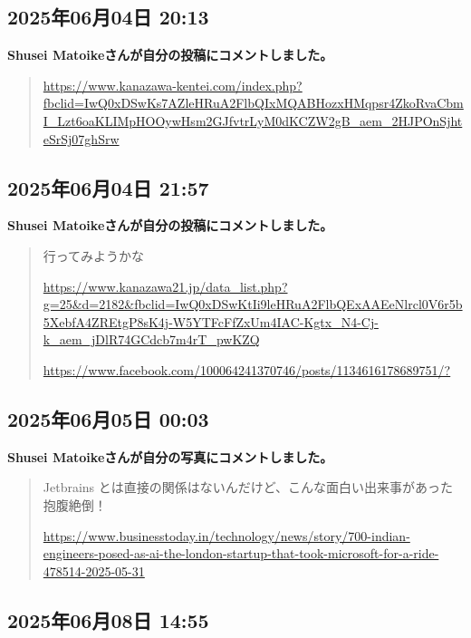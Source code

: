\subsection*{2025年06月04日 20:13}

\textbf{Shusei Matoikeさんが自分の投稿にコメントしました。}

\begin{quote}
\url{https://www.kanazawa-kentei.com/index.php?fbclid=IwQ0xDSwKs7AZleHRuA2FlbQIxMQABHozxHMqpsr4ZkoRvaCbmI_Lzt6oaKLIMpHOOywHsm2GJfvtrLyM0dKCZW2gB_aem_2HJPOnSjhteSrSj07ghSrw}
\end{quote}

\subsection*{2025年06月04日 21:57}

\textbf{Shusei Matoikeさんが自分の投稿にコメントしました。}

\begin{quote}
行ってみようかな

\url{https://www.kanazawa21.jp/data_list.php?g=25&d=2182&fbclid=IwQ0xDSwKtIi9leHRuA2FlbQExAAEeNlrcl0V6r5b5XebfA4ZREtgP8sK4j-W5YTFcFfZxUm4IAC-Kgtx_N4-Cj-k_aem_jDlR74GCdcb7m4rT_pwKZQ}

\url{https://www.facebook.com/100064241370746/posts/1134616178689751/?}
\end{quote}

\subsection*{2025年06月05日 00:03}

\textbf{Shusei Matoikeさんが自分の写真にコメントしました。}

\begin{quote}
Jetbrains とは直接の関係はないんだけど、こんな面白い出来事があった🤭😅抱腹絶倒！

\url{https://www.businesstoday.in/technology/news/story/700-indian-engineers-posed-as-ai-the-london-startup-that-took-microsoft-for-a-ride-478514-2025-05-31}
\end{quote}

\subsection*{2025年06月08日 14:55}

